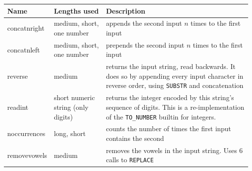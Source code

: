 \documentclass[twoside,11pt,a4paper]{article}
\newcommand{\pls}[1]{\small\texttt{#1}\normalsize}
\begin{document}
\begin{center}
\begin{tabular}{|l|P{3cm}|p{9cm}|}
\hline
Name				& Lengths used		& Description\\
\hline
concatnright		& medium, short, one number				& appends the second input $n$ times to the first input\\
concatnleft		& medium, short, one number				& prepends the second input $n$ times to the first input\\
reverse			& medium				& returns the input string, read backwards. It does so by appending every input character in reverse order, using \pls{SUBSTR} and concatenation\\
readint		& short numeric string (only digits)				& returns the integer encoded by this string's sequence of digits. This is a re-implementation of the \pls{TO\_NUMBER} builtin for integers.\\
noccurrences		& long, short				& counts the number of times the first input contains the second\\
removevowels		& medium				& removes the vowels in the input string. Uses 6 calls to \pls{REPLACE}\\
\hline
\end{tabular}
\end{center}
\end{document}
